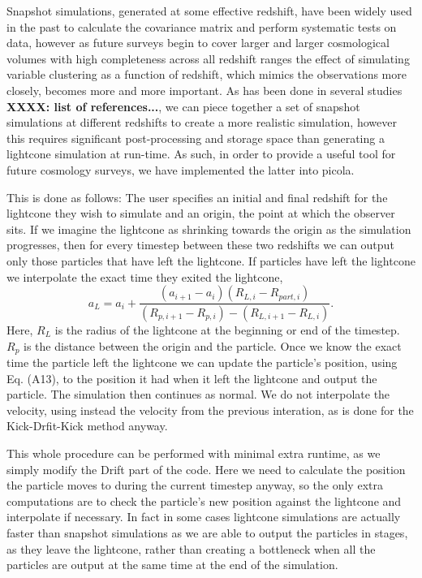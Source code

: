 \documentclass[5p,authoryear]{elsarticle}
\begin{document}
Snapshot simulations, generated at some effective redshift, have been widely used in the past to calculate the covariance matrix and perform systematic tests on data, however as future surveys begin to cover larger and larger cosmological volumes with high completeness across all redshift ranges the effect of simulating variable clustering as a function of redshift, which mimics the observations more closely, becomes more and more important. As has been done in several studies \textbf{XXXX: list of references...}, we can piece together a set of snapshot simulations at different redshifts to create a more realistic simulation, however this requires significant post-processing and storage space than generating a lightcone simulation at run-time. As such, in order to provide a useful tool for future cosmology surveys, we have implemented the latter into {\sc picola}.

This is done as follows: The user specifies an initial and final redshift for the lightcone they wish to simulate and an origin, the point at which the observer sits. If we imagine the lightcone as shrinking towards the origin as the simulation progresses, then for every timestep between these two redshifts we can output only those particles that have left the lightcone. If particles have left the lightcone we interpolate the exact time they exited the lightcone,
\begin{equation}
a_{L} = a_{i}+\frac{(a_{i+1}-a_{i})(R_{L,i}-R_{part,i})}{(R_{p,i+1}-R_{p,i})-(R_{L,i+1}-R_{L,i})}.
\end{equation}
Here, $R_{L}$ is the radius of the lightcone at the beginning or end of the timestep. $R_{p}$ is the distance between the origin and the particle. Once we know the exact time the particle left the lightcone we can update the particle's position, using Eq. (A13), to the position it had when it left the lightcone and output the particle. The simulation then continues as normal. We do not interpolate the velocity, using instead the velocity from the previous interation, as is done for the Kick-Drfit-Kick method anyway.

This whole procedure can be performed with minimal extra runtime, as we simply modify the Drift part of the code. Here we need to calculate the position the particle moves to during the current timestep anyway, so the only extra computations are to check the particle's new position against the lightcone and interpolate if necessary. In fact in some cases lightcone simulations are actually faster than snapshot simulations as we are able to output the particles in stages, as they leave the lightcone, rather than creating a bottleneck when all the particles are output at the same time at the end of the simulation.
\end{document}
